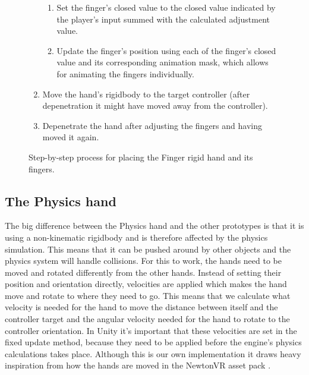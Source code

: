 \begin{figure}[H]
\begin{enumerate}[noitemsep]
\begin{enumerate}[noitemsep]
\item Set the finger's closed value to the closed value indicated by the player's input summed with the calculated adjustment value.
\item Update the finger's position using each of the finger's closed value and its corresponding animation mask, which allows for animating the fingers individually.
\end{enumerate}
\item Move the hand's rigidbody to the target controller (after depenetration it might have moved away from the controller).
\item Depenetrate the hand after adjusting the fingers and having moved it again.
\end{enumerate}
\caption{Step-by-step process for placing the Finger rigid hand and its fingers.}
\label{fig:stepByStepFingerRigidHand}
\end{figure}


\subsection{The Physics hand}
\label{subsec:slidingRigidHand}
The big difference between the Physics hand and the other prototypes is that it is using a non-kinematic rigidbody and is therefore affected by the physics simulation. This means that it can be pushed around by other objects and the physics system will handle collisions. For this to work, the hands need to be moved and rotated differently from the other hands. Instead of setting their position and orientation directly, velocities are applied which makes the hand move and rotate to where they need to go. This means that we calculate what velocity is needed for the hand to move the distance between itself and the controller target and the angular velocity needed for the hand to rotate to the controller orientation. In Unity it's important that these velocities are set in the fixed update method, because they need to be applied before the engine's physics calculations takes place. Although this is our own implementation it draws heavy inspiration from how the hands are moved in the NewtonVR asset pack \parencite{TomorrowTodayLabs2016}.

